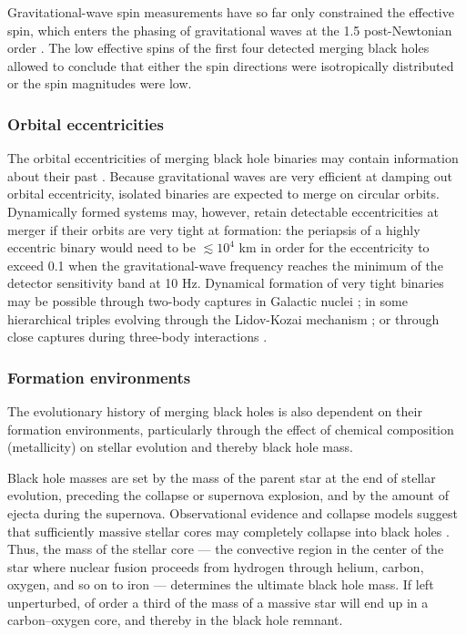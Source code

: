 \documentclass[iop,onecolumn]{revtex4-1}
\begin{document}
Gravitational-wave spin measurements have so far only constrained the effective spin, which enters the phasing of gravitational waves at the 1.5 post-Newtonian order \citep{PoissonWill:1995}.  The low effective spins of the first four detected merging black holes allowed \citet{Farr:2017} to conclude that either the spin directions were isotropically distributed or the spin magnitudes were low.

\subsubsection{Orbital eccentricities}
	The orbital eccentricities of merging black hole binaries may contain information about their past \citep{MandelOShaughnessy:2010}. Because gravitational waves are very efficient at damping out orbital eccentricity, isolated binaries are expected to merge on circular orbits. Dynamically formed systems may, however, retain detectable eccentricities at merger if their orbits are very tight at formation: the periapsis of a highly eccentric binary would need to be $\lesssim 10^4$ km in order for the eccentricity to exceed 0.1 when the gravitational-wave frequency reaches the minimum of the detector sensitivity band at 10 Hz.  Dynamical formation of very tight binaries may be possible through two-body captures in Galactic nuclei \citep{OLeary:2008} \citep[but see][]{Tsang:2013}; in some hierarchical triples evolving through the Lidov-Kozai mechanism \citep[e.g.,][]{AntoniniPerets:2012}; or through close captures during three-body interactions \citep{Samsing:2014, Rodriguez:2018}. 


\subsubsection{Formation environments}
\label{environ}
The evolutionary history of merging black holes is also dependent on their formation environments, particularly through the effect of chemical composition (metallicity) on stellar evolution and thereby black hole mass.

Black hole masses are set by the mass of the parent star at the end of stellar evolution, preceding the collapse or supernova explosion, and by the amount of ejecta during the supernova. Observational evidence and collapse models suggest that sufficiently massive stellar cores may completely collapse into black holes \citep[for a review, see][]{Mirabel:2016}. Thus, the mass of the stellar core --- the convective region in the center of the star where nuclear fusion proceeds from hydrogen through helium, carbon, oxygen, and so on to iron --- determines the ultimate black hole mass.  If left unperturbed, of order a third of the mass of a massive star will end up in a carbon--oxygen core, and thereby in the black hole remnant.
\end{document}
